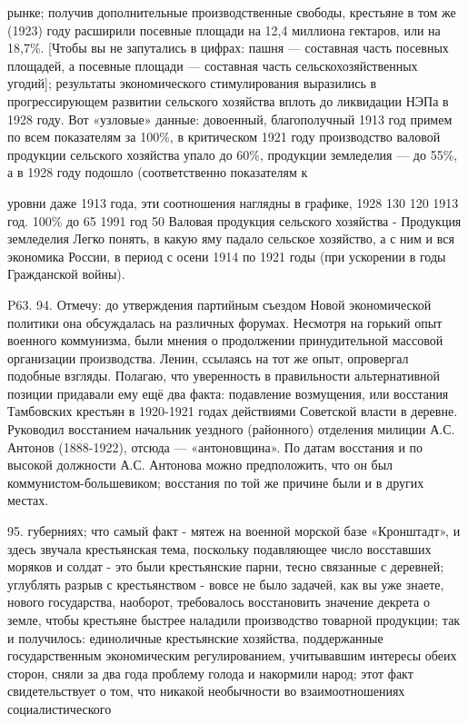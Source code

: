 \label{092-1}
рынке; получив дополнительные производственные свободы, крестьяне в том же (1923) году расширили посевные площади на 12,4 миллиона гектаров, или на 18,7\%. [Чтобы вы не запутались в цифрах: пашня — составная часть посевных площадей, а посевные площади — составная часть сельскохозяйственных угодий]; результаты экономического стимулирования выразились в прогрессирующем развитии сельского хозяйства вплоть до ликвидации НЭПа в 1928 году. Вот «узловые» данные: довоенный, благополучный 1913 год примем по всем показателям за 100\%, в критическом 1921 году производство валовой продукции сельского хозяйства упало до 60\%, продукции земледелия — до 55\%, а в 1928 году подошло (соответственно показателям к

\label{093-1}
уровни даже 1913 года, эти соотношения наглядны в графике, 1928 130 120 1913 год. 100\% до 65 1991 год 50 Валовая продукция сельского хозяйства - Продукция земледелия Легко понять, в какую яму падало сельское хозяйство, а с ним и вся экономика России, в период с осени 1914 по 1921 годы (при ускорении в годы Гражданской войны).

\label{094-1}
P63. 94. Отмечу: до утверждения партийным съездом Новой экономической политики она обсуждалась на различных форумах. Несмотря на горький опыт военного коммунизма, были мнения о продолжении принудительной массовой организации производства. Ленин, ссылаясь на тот же опыт, опровергал подобные взгляды. Полагаю, что уверенность в правильности альтернативной позиции придавали ему ещё два факта: подавление возмущения, или восстания Тамбовских крестьян в 1920-1921 годах действиями Советской власти в деревне. Руководил восстанием начальник уездного (районного) отделения милиции А.С. Антонов (1888-1922), отсюда — «антоновщина». По датам восстания и по высокой должности А.С. Антонова можно предположить, что он был коммунистом-большевиком; восстания по той же причине были и в других местах.

\label{095-1}
95. губерниях; что самый факт - мятеж на военной морской базе «Кронштадт», и здесь звучала крестьянская тема, поскольку подавляющее число восставших моряков и солдат - это были крестьянские парни, тесно связанные с деревней; углублять разрыв с крестьянством - вовсе не было задачей, как вы уже знаете, нового государства, наоборот, требовалось восстановить значение декрета о земле, чтобы крестьяне быстрее наладили производство товарной продукции; так и получилось: единоличные крестьянские хозяйства, поддержанные государственным экономическим регулированием, учитывавшим интересы обеих сторон, сняли за два года проблему голода и накормили народ; этот факт свидетельствует о том, что никакой необычности во взаимоотношениях социалистического

